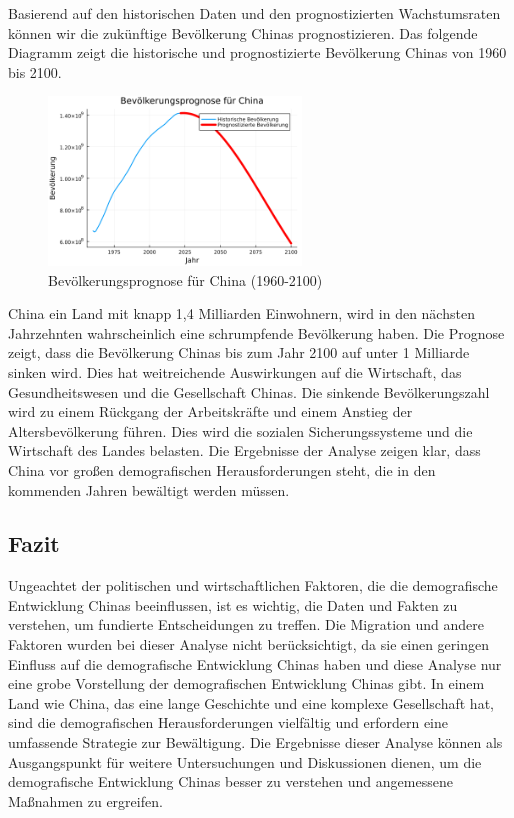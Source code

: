Basierend auf den historischen Daten und den prognostizierten Wachstumsraten können wir die zukünftige Bevölkerung Chinas prognostizieren. Das folgende Diagramm zeigt die historische und prognostizierte Bevölkerung Chinas von 1960 bis 2100.

\begin{figure}[H]
    \centering
    \includegraphics[width=0.6\textwidth]{bevoelkerungsprognose_china.png}
    \caption{Bevölkerungsprognose für China (1960-2100)}
    \label{fig:bevoelkerungsprognose_china}
\end{figure}

China ein Land mit knapp 1,4 Milliarden Einwohnern, wird in den nächsten Jahrzehnten wahrscheinlich eine schrumpfende Bevölkerung haben. Die Prognose zeigt, dass die Bevölkerung Chinas bis zum Jahr 2100 auf unter 1 Milliarde sinken wird. Dies hat weitreichende Auswirkungen auf die Wirtschaft, das Gesundheitswesen und die Gesellschaft Chinas. Die sinkende Bevölkerungszahl wird zu einem Rückgang der Arbeitskräfte und einem Anstieg der Altersbevölkerung führen. Dies wird die sozialen Sicherungssysteme und die Wirtschaft des Landes belasten. Die Ergebnisse der Analyse zeigen klar, dass China vor großen demografischen Herausforderungen steht, die in den kommenden Jahren bewältigt werden müssen. 

\subsection{Fazit}

Ungeachtet der politischen und wirtschaftlichen Faktoren, die die demografische Entwicklung Chinas beeinflussen, ist es wichtig, die Daten und Fakten zu verstehen, um fundierte Entscheidungen zu treffen. Die Migration und andere Faktoren wurden bei dieser Analyse nicht berücksichtigt, da sie einen geringen Einfluss auf die demografische Entwicklung Chinas haben und diese Analyse nur eine grobe Vorstellung der demografischen Entwicklung Chinas gibt. In einem Land wie China, das eine lange Geschichte und eine komplexe Gesellschaft hat, sind die demografischen Herausforderungen vielfältig und erfordern eine umfassende Strategie zur Bewältigung. Die Ergebnisse dieser Analyse können als Ausgangspunkt für weitere Untersuchungen und Diskussionen dienen, um die demografische Entwicklung Chinas besser zu verstehen und angemessene Maßnahmen zu ergreifen.

